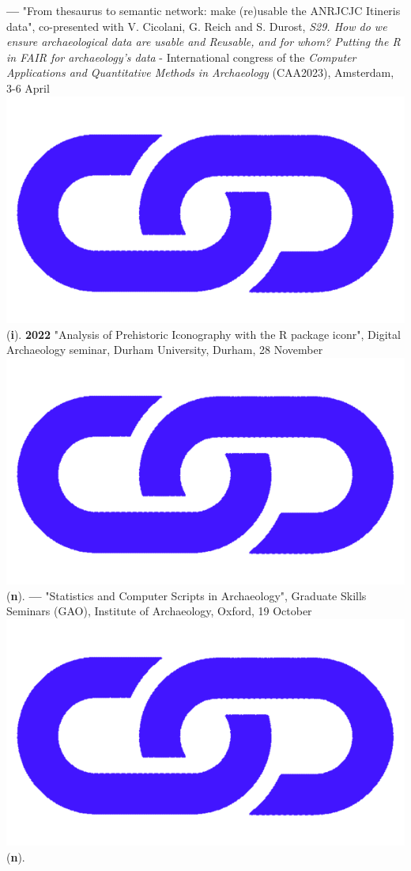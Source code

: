 \documentclass{article}
\begin{document}
\textbf{--- }"From thesaurus to semantic network: make (re)usable the ANRJCJC Itineris data", co-presented with V. Cicolani, G. Reich and S. Durost, \textit{S29. How do we ensure archaeological data are usable and Reusable, and for whom? Putting the R in FAIR for archaeology's data} - International congress of the \textit{Computer Applications and Quantitative Methods in Archaeology} (CAA2023), Amsterdam, 3-6 April \href{https://anr-itineris.github.io/itineris/talk/caa-2023/thesaurus/pres/#/title-slide}{\includegraphics[scale=0.02]{link_darkblue.png}} (\textbf{i}).
\smallbreak
\textbf{2022 }"Analysis of Prehistoric Iconography with the R package iconr", Digital Archaeology seminar, Durham University, Durham, 28 November \href{http://shinyserver.cfs.unipi.it:3838/durham/_site/#/title-slide}{\includegraphics[scale=0.02]{link_darkblue.png}} (\textbf{n}).
\smallbreak
\textbf{--- }"Statistics and Computer Scripts in Archaeology", Graduate Skills Seminars (GAO), Institute of Archaeology, Oxford, 19 October \href{http://shinyserver.cfs.unipi.it:3838/teach/stats/gao/_site/#/title-slide}{\includegraphics[scale=0.02]{link_darkblue.png}} (\textbf{n}).
\end{document}
